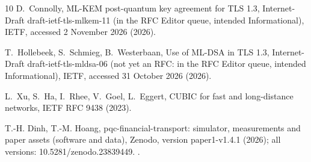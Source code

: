 \documentclass[preprint,12pt]{elsarticle}
\begin{document}
\begin{thebibliography}{10}
D.~Connolly, {ML-KEM} post-quantum key agreement for {TLS} 1.3, Internet-Draft
  draft-ietf-tls-mlkem-11 (in the RFC Editor queue, intended Informational),
  {IETF}, accessed 2 November 2026 (2026).

T.~Hollebeek, S.~Schmieg, B.~Westerbaan, Use of {ML-DSA} in {TLS} 1.3,
  Internet-Draft draft-ietf-tls-mldsa-06 (not yet an RFC: in the RFC Editor
  queue, intended Informational), {IETF}, accessed 31 October 2026 (2026).

L.~Xu, S.~Ha, I.~Rhee, V.~Goel, L.~Eggert, {CUBIC} for fast and long-distance
  networks, {IETF} RFC 9438 (2023).

T.-H. Dinh, T.-M. Hoang, pqc-financial-transport: simulator, measurements and paper assets
  (software and data), Zenodo, version paper1-v1.4.1 (2026); all versions:
  10.5281/zenodo.23839449.
\newblock \href {https://doi.org/10.5281/zenodo.24312834}
  {}.

\end{thebibliography}
\end{document}
